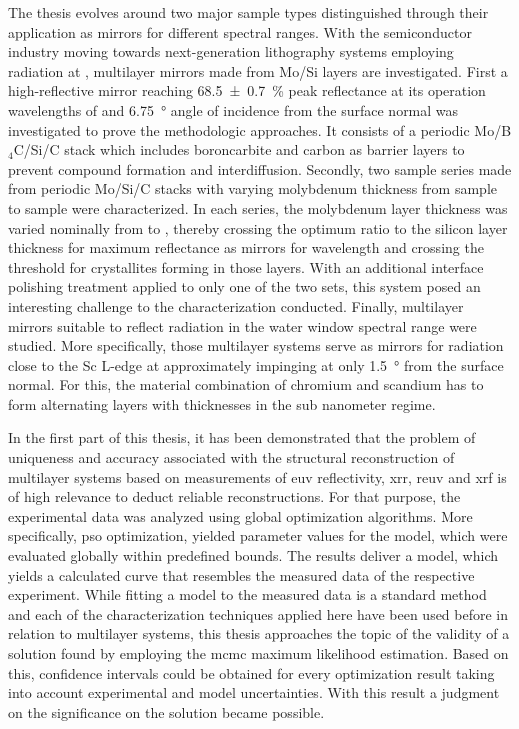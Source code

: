 The thesis evolves around two major sample types distinguished through their application as mirrors for different spectral ranges. With the semiconductor industry moving towards next-generation lithography systems employing radiation at , multilayer mirrors made from Mo/Si layers are investigated. First a high-reflective mirror reaching \SI{68.5 \pm 0.7}{\percent} peak reflectance at its operation wavelengths of  and \SI{6.75}{\degree} angle of incidence from the surface normal was investigated to prove the methodologic approaches. It consists of a periodic Mo/B$_4$C/Si/C stack which includes boroncarbite and carbon as barrier layers to prevent compound formation and interdiffusion. Secondly, two sample series made from periodic Mo/Si/C stacks with varying molybdenum thickness from sample to sample were characterized. In each series, the molybdenum layer thickness was varied nominally from  to , thereby crossing the optimum ratio to the silicon layer thickness for maximum reflectance as mirrors for  wavelength and crossing the threshold for crystallites forming in those layers. With an additional interface polishing treatment applied to only one of the two sets, this system posed an interesting challenge to the characterization conducted. Finally, multilayer mirrors suitable to reflect radiation in the water window spectral range were studied. More specifically, those multilayer systems serve as mirrors for radiation close to the Sc L-edge at approximately  impinging at only \SI{1.5}{\degree} from the surface normal. For this, the material combination of chromium and scandium has to form alternating layers with thicknesses in the sub nanometer regime.

In the first part of this thesis, it has been demonstrated that the problem of uniqueness and accuracy associated with the structural reconstruction of multilayer systems based on measurements of \gls{euv} reflectivity, \gls{xrr}, \gls{reuv} and \gls{xrf} is of high relevance to deduct reliable reconstructions. For that purpose, the experimental data was analyzed using global optimization algorithms. More specifically, \gls{pso} optimization, yielded parameter values for the model, which were evaluated globally within predefined bounds. The results deliver a model, which yields a calculated curve that resembles the measured data of the respective experiment. While fitting a model to the measured data is a standard method and each of the characterization techniques applied here have been used before in relation to multilayer systems, this thesis approaches the topic of the validity of a solution found by employing the \gls{mcmc} maximum likelihood estimation. Based on this, confidence intervals could be obtained for every optimization result taking into account experimental and model uncertainties. With this result a judgment on the significance on the solution became possible.


